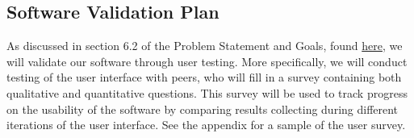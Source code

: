 \documentclass[12pt, titlepage]{article}
\begin{document}



\subsection{Software Validation Plan}
  As discussed in section 6.2 of the Problem Statement and Goals, found \href{https://github.com/OKKM-insights/OKKM.insights/blob/main/docs/ProblemStatementAndGoals/ProblemStatement.pdf}{here}, 
  we will validate our software through user testing. More specifically, we will conduct testing of the user interface with peers, who will fill in a survey containing both qualitative and quantitative questions.
  This survey will be used to track progress on the usability of the software by comparing results collecting during different iterations of the user interface. See the appendix for a sample of the user survey.




\end{document}
